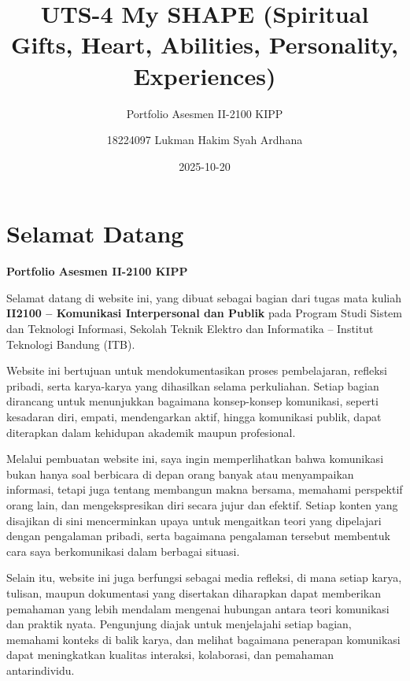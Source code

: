\documentclass[
  letterpaper,
  DIV=11,
  numbers=noendperiod]{scrreprt}
\title{UTS-4 My SHAPE (Spiritual Gifts, Heart, Abilities, Personality,
Experiences)}
\subtitle{Portfolio Asesmen II-2100 KIPP}
\author{18224097 Lukman Hakim Syah Ardhana}
\date{2025-10-20}
\renewcommand*\contentsname{Table of contents}
\newcommand\contentsname{Table of contents}
\begin{document}
\maketitle

\renewcommand*\contentsname{Table of contents}
{
\hypersetup{linkcolor=}
\setcounter{tocdepth}{2}
\tableofcontents
}


\chapter*{Selamat Datang}\label{selamat-datang}


\textbf{Portfolio Asesmen II-2100 KIPP}

Selamat datang di website ini, yang dibuat sebagai bagian dari tugas
mata kuliah \textbf{II2100 -- Komunikasi Interpersonal dan Publik} pada
Program Studi Sistem dan Teknologi Informasi, Sekolah Teknik Elektro dan
Informatika -- Institut Teknologi Bandung (ITB).

Website ini bertujuan untuk mendokumentasikan proses pembelajaran,
refleksi pribadi, serta karya-karya yang dihasilkan selama perkuliahan.
Setiap bagian dirancang untuk menunjukkan bagaimana konsep-konsep
komunikasi, seperti kesadaran diri, empati, mendengarkan aktif, hingga
komunikasi publik, dapat diterapkan dalam kehidupan akademik maupun
profesional.

Melalui pembuatan website ini, saya ingin memperlihatkan bahwa
komunikasi bukan hanya soal berbicara di depan orang banyak atau
menyampaikan informasi, tetapi juga tentang membangun makna bersama,
memahami perspektif orang lain, dan mengekspresikan diri secara jujur
dan efektif. Setiap konten yang disajikan di sini mencerminkan upaya
untuk mengaitkan teori yang dipelajari dengan pengalaman pribadi, serta
bagaimana pengalaman tersebut membentuk cara saya berkomunikasi dalam
berbagai situasi.

Selain itu, website ini juga berfungsi sebagai media refleksi, di mana
setiap karya, tulisan, maupun dokumentasi yang disertakan diharapkan
dapat memberikan pemahaman yang lebih mendalam mengenai hubungan antara
teori komunikasi dan praktik nyata. Pengunjung diajak untuk menjelajahi
setiap bagian, memahami konteks di balik karya, dan melihat bagaimana
penerapan komunikasi dapat meningkatkan kualitas interaksi, kolaborasi,
dan pemahaman antarindividu.
\end{document}
